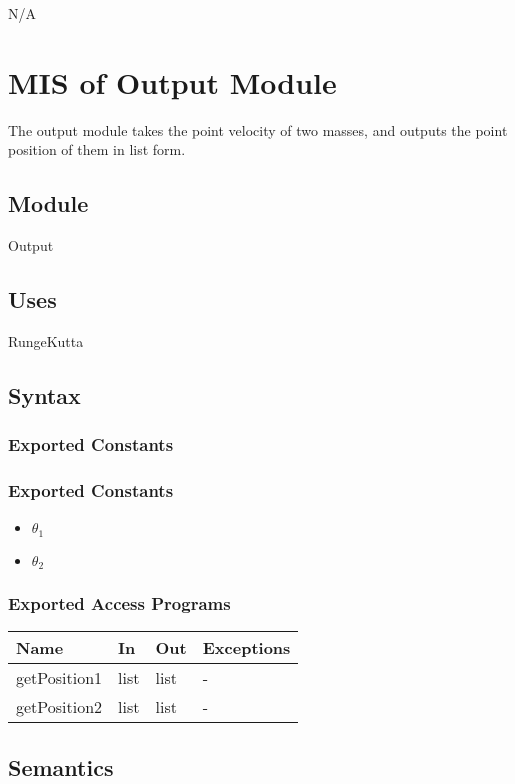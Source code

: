\documentclass[12pt, titlepage]{article}
\begin{document}
N/A
\newpage


\section{MIS of Output Module} \label{OModule} 
The output module takes the point velocity of two masses, and outputs the point position of them in list form.

\subsection{Module}
Output

\subsection{Uses}
RungeKutta

\subsection{Syntax}

\subsubsection{Exported Constants}
\subsubsection{Exported Constants}
\begin{itemize}
  \item ${\theta_1}$
  \item ${\theta_2}$
\end{itemize}

\subsubsection{Exported Access Programs}

\begin{center}
\begin{tabular}{p{2cm} p{4cm} p{4cm} p{2cm}}
\hline
\textbf{Name} & \textbf{In} & \textbf{Out} & \textbf{Exceptions} \\
\hline
getPosition1 & list & list & - \\
\hline
getPosition2 & list & list & - \\
\hline
\end{tabular}
\end{center}

\subsection{Semantics}
\end{document}
